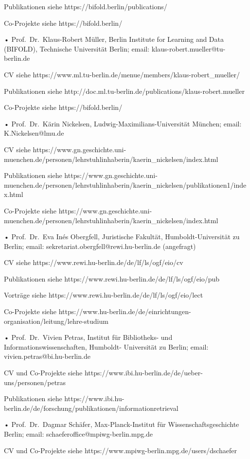 \documentclass[
]{article}
\begin{document}
Publikationen siehe https://bifold.berlin/publications/

Co-Projekte siehe https://bifold.berlin/

• Prof.~Dr.~Klaus-Robert Müller, Berlin Institute for Learning and Data
(BIFOLD), Technische Universität Berlin; email:
klaus-robert.mueller@tu-berlin.de

CV siehe
https://www.ml.tu-berlin.de/menue/members/klaus-robert\_mueller/

Publikationen siehe
http://doc.ml.tu-berlin.de/publications/klaus-robert.mueller

Co-Projekte siehe https://bifold.berlin/

• Prof.~Dr.~Kärin Nickelsen, Ludwig-Maximilians-Universität München;
email: K.Nickelsen@lmu.de

CV siehe
https://www.gn.geschichte.uni-muenchen.de/personen/lehrstuhlinhaberin/kaerin\_nickelsen/index.html

Publikationen siehe
https://www.gn.geschichte.uni-muenchen.de/personen/lehrstuhlinhaberin/kaerin\_nickelsen/publikationen1/index.html

Co-Projekte siehe
https://www.gn.geschichte.uni-muenchen.de/personen/lehrstuhlinhaberin/kaerin\_nickelsen/index.html

• Prof.~Dr.~Eva Inés Obergfell, Juristische Fakultät,
Humboldt-Universität zu Berlin; email:
sekretariat.obergfell@rewi.hu-berlin.de (angefragt)

CV siehe https://www.rewi.hu-berlin.de/de/lf/ls/ogf/eio/cv

Publikationen siehe https://www.rewi.hu-berlin.de/de/lf/ls/ogf/eio/pub

Vorträge siehe https://www.rewi.hu-berlin.de/de/lf/ls/ogf/eio/lect

Co-Projekte siehe
https://www.hu-berlin.de/de/einrichtungen-organisation/leitung/lehre-studium

• Prof.~Dr.~Vivien Petras, Institut für Bibliotheks- und
Informationswissenschaften, Humboldt- Universität zu Berlin; email:
vivien.petras@bi.hu-berlin.de

CV und Co-Projekte siehe
https://www.ibi.hu-berlin.de/de/ueber-uns/personen/petras

Publikationen siehe
https://www.ibi.hu-berlin.de/de/forschung/publikationen/informationretrieval

• Prof.~Dr.~Dagmar Schäfer, Max-Planck-Institut für
Wissenschaftsgeschichte Berlin; email:
schaeferoffice@mpiwg-berlin.mpg.de

CV und Co-Projekte siehe https://www.mpiwg-berlin.mpg.de/users/dschaefer
\end{document}
